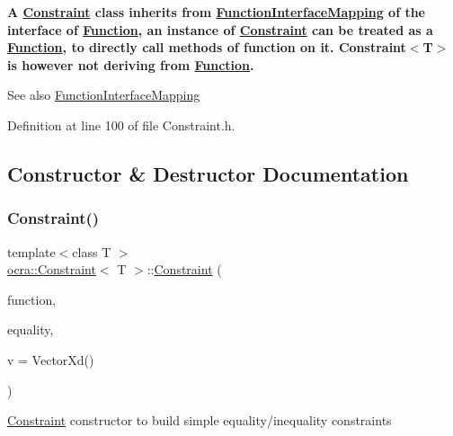 {\bfseries A \hyperlink{classocra_1_1Constraint}{Constraint} class inherits from \hyperlink{structocra_1_1FunctionInterfaceMapping}{Function\+Interface\+Mapping} of the interface of \hyperlink{classocra_1_1Function}{Function}, an instance of \hyperlink{classocra_1_1Constraint}{Constraint} can be treated as a \hyperlink{classocra_1_1Function}{Function}, to directly call methods of function on it. Constraint$<$\+T$>$ is however not deriving from \hyperlink{classocra_1_1Function}{Function}.}

{\bfseries \begin{DoxySeeAlso}{See also}
\hyperlink{structocra_1_1FunctionInterfaceMapping}{Function\+Interface\+Mapping} 
\end{DoxySeeAlso}
}

Definition at line 100 of file Constraint.\+h.



\subsection{Constructor \& Destructor Documentation}
\hypertarget{classocra_1_1Constraint_a73cc6c5b8e5c29ae3c1d8ed997c9e6e5}{}\label{classocra_1_1Constraint_a73cc6c5b8e5c29ae3c1d8ed997c9e6e5} 
\subsubsection{\texorpdfstring{Constraint()}{Constraint()}\hspace{0.1cm}{\footnotesize\ttfamily [1/2]}}
{\footnotesize\ttfamily template$<$class T $>$ \\
\hyperlink{classocra_1_1Constraint}{ocra\+::\+Constraint}$<$ T $>$\+::\hyperlink{classocra_1_1Constraint}{Constraint} (\begin{DoxyParamCaption}\item[{T $\ast$}]{function,  }\item[{bool}]{equality,  }\item[{const Vector\+Xd \&}]{v = {\ttfamily VectorXd()} }\end{DoxyParamCaption})\hspace{0.3cm}{\ttfamily [inline]}}

\hyperlink{classocra_1_1Constraint}{Constraint} constructor to build simple equality/inequality constraints


